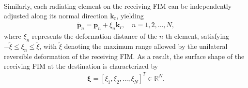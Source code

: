 \documentclass[lettersize,journal]{IEEEtran}
\begin{document}
Similarly, each radiating element on the receiving FIM can be independently adjusted along its normal direction $\mathbf{k}_{\textrm{r}}$, yielding
\begin{align}
 \tilde{\mathbf{p}}_{n}=\mathbf{p}_{n}+\xi_{n}\mathbf{k}_{\textrm{r}},\quad n=1,2,\ldots,N,
\end{align}
where $\xi_{n}$ represents the deformation distance of the $n$-th element, satisfying $-\tilde{\xi} \leq \xi_{n} \leq \tilde{\xi}$, with $\tilde{\xi}$ denoting the maximum range allowed by the unilateral reversible deformation of the receiving FIM. As a result, the surface shape of the receiving FIM at the destination is characterized by
\begin{align}
 \boldsymbol{\xi} =\left [ \xi_{1}, \xi_{2},\ldots , \xi_{N} \right ]^{T}\in \mathbb{R}^{N}.
\end{align}
\end{document}
